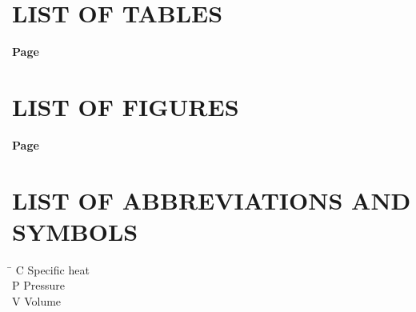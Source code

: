 
\cleardoublepage
\makeatletter
\chapter*{LIST OF TABLES}
\vspace{1.5\baselineskip}
\hfill{\bfseries Page}\par\vspace{.5\baselineskip}
\makeatother
\cleardoublepage

\makeatletter
\chapter*{LIST OF FIGURES}
\vspace{1.5\baselineskip}
\hfill{\bfseries Page}\par\vspace{.5\baselineskip}
\makeatother

\cleardoublepage
\makeatletter
\chapter*{LIST OF ABBREVIATIONS AND SYMBOLS}

\vspace{1.5\baselineskip}
\noindent
\begin{tabbing}
\hspace{2.5cm}\=\kill
C \> Specific heat \\
P \> Pressure \\
V \> Volume
\end{tabbing}
\makeatother
